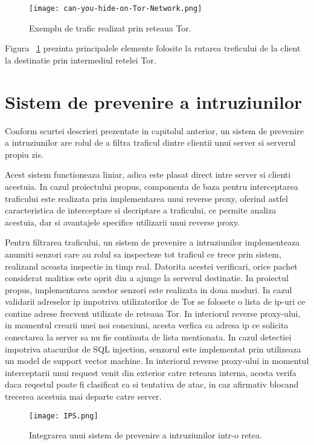 \begin{figure}[h]
	\centering
	\texttt{[image: can-you-hide-on-Tor-Network.png]}
	\caption{Exemplu de trafic realizat prin reteaua Tor.}
	\label{fig:tor-example}
\end{figure}

Figura ~\ref{fig:tor-example} prezinta principalele elemente folosite la rutarea treficului de la client la destinatie prin intermediul retelei Tor. \\
\section{Sistem de prevenire a intruziunilor}
Conform scurtei descrieri prezentate in capitolul anterior, un sistem de prevenire a intruziunilor are rolul de a filtra traficul dintre clientii unui server si serverul propiu zis. 

Acest sistem functioneaza liniar, adica este plasat direct intre server si clienti acestuia. In cazul proiectului propus, componenta de baza pentru interceptarea traficului este realizata prin implementarea unui reverse proxy, oferind astfel caracteristica de interceptare si decriptare a traficului, ce permite analiza acestuia, dar si avantajele specifice utilizarii unui reverse proxy.

Pentru filtrarea traficului, un sistem de prevenire a intruziunilor implementeaza anumiti senzori care au rolul sa inspecteze tot traficul ce trece prin sistem, realizand aceasta inspectie in timp real. Datorita acestei verificari, orice pachet considerat malitios este oprit din a ajunge la serverul destinatie. In proiectul propus, implementarea acestor senzori este realizata in doua moduri. In cazul validarii adreselor ip impotriva utilizatorilor de Tor se folosete o lista de ip-uri ce contine adrese frecvent utilizate de reteaua Tor. In interiorul reverse proxy-ului, in momentul crearii unei noi conexiuni, acesta verfica ca adresa ip ce solicita conectarea la server sa nu fie continuta de lista mentionata. In cazul detectiei impotriva atacurilor de SQL injection, senzorul este implementat prin utilizeaza un model de support vector machine. In interiorul reverse proxy-ului in momentul interceptarii unui request venit din exterior catre reteaua interna, acesta verifa daca reqestul poate fi clasificat ca si tentativa de atac, in caz afirmativ blocand trecerea acestuia mai departe catre server.
\begin{figure}[h]
	\centering
	\texttt{[image: IPS.png]}
	\caption{Integrarea unui sistem de prevenire a intruziunilor intr-o retea.}
	\label{fig:ips-2nd-example}
\end{figure}

